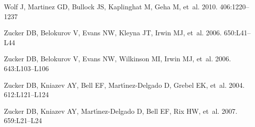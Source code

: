 \documentclass[a4paper]{ar-1col}
\begin{document}
\begin{thebibliography}{}
{Wolf} J, {Martinez} GD, {Bullock} JS, {Kaplinghat} M, {Geha} M, et~al. 2010.
\textit{\mnras} 406:1220--1237

{Zucker} DB, {Belokurov} V, {Evans} NW, {Kleyna} JT, {Irwin} MJ, et~al.
  2006{}.
\textit{\apjl} 650:L41--L44

{Zucker} DB, {Belokurov} V, {Evans} NW, {Wilkinson} MI, {Irwin} MJ, et~al.
  2006{}.
\textit{\apjl} 643:L103--L106

{Zucker} DB, {Kniazev} AY, {Bell} EF, {Mart{\'{\i}}nez-Delgado} D, {Grebel} EK,
  et~al. 2004.
\textit{\apjl} 612:L121--L124

{Zucker} DB, {Kniazev} AY, {Mart{\'{\i}}nez-Delgado} D, {Bell} EF, {Rix} HW,
  et~al. 2007.
\textit{\apjl} 659:L21--L24

\end{thebibliography}
\end{document}
